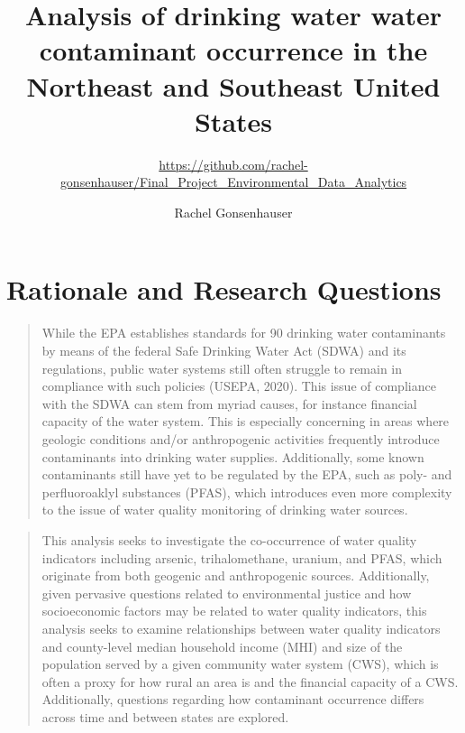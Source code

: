\documentclass[12pt,]{article}
\title{Analysis of drinking water water contaminant occurrence in the Northeast
and Southeast United States}
\subtitle{\url{https://github.com/rachel-gonsenhauser/Final_Project_Environmental_Data_Analytics}}
\author{Rachel Gonsenhauser}
\date{}
\begin{document}
\maketitle

\newpage
\abstract

\begin{quote}
\end{quote}

\newpage
\tableofcontents 
\newpage
\listoftables 
\newpage
\listoffigures 
\newpage

\hypertarget{rationale-and-research-questions}{%
\section{Rationale and Research
Questions}\label{rationale-and-research-questions}}

\begin{quote}
While the EPA establishes standards for 90 drinking water contaminants
by means of the federal Safe Drinking Water Act (SDWA) and its
regulations, public water systems still often struggle to remain in
compliance with such policies (USEPA, 2020). This issue of compliance
with the SDWA can stem from myriad causes, for instance financial
capacity of the water system. This is especially concerning in areas
where geologic conditions and/or anthropogenic activities frequently
introduce contaminants into drinking water supplies. Additionally, some
known contaminants still have yet to be regulated by the EPA, such as
poly- and perfluoroaklyl substances (PFAS), which introduces even more
complexity to the issue of water quality monitoring of drinking water
sources.
\end{quote}

\begin{quote}
This analysis seeks to investigate the co-occurrence of water quality
indicators including arsenic, trihalomethane, uranium, and PFAS, which
originate from both geogenic and anthropogenic sources. Additionally,
given pervasive questions related to environmental justice and how
socioeconomic factors may be related to water quality indicators, this
analysis seeks to examine relationships between water quality indicators
and county-level median household income (MHI) and size of the
population served by a given community water system (CWS), which is
often a proxy for how rural an area is and the financial capacity of a
CWS. Additionally, questions regarding how contaminant occurrence
differs across time and between states are explored.
\end{quote}
\end{document}
